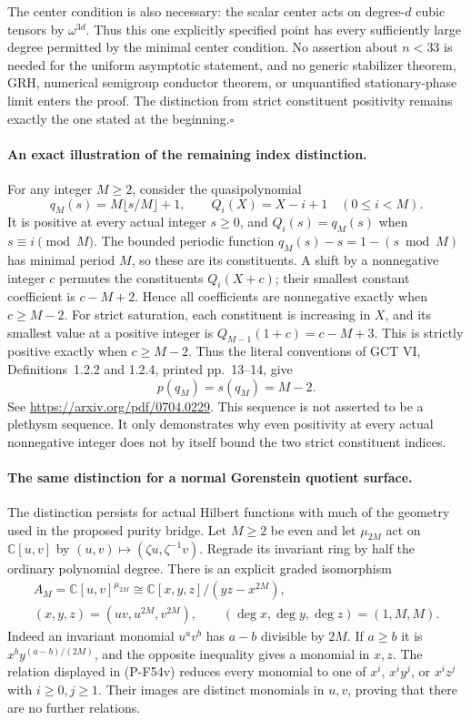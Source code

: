 \documentclass[11pt,a4paper]{article}
\begin{document}
The center condition is also necessary: the scalar center
acts on degree-$d$ cubic tensors by $\omega^{3d}$.
Thus this one explicitly specified point has every
sufficiently large degree permitted by the minimal center
condition. No assertion about $n<33$ is needed for the
uniform asymptotic statement, and no generic stabilizer
theorem, GRH, numerical semigroup conductor theorem, or
unquantified stationary-phase limit enters the proof.
The distinction from strict constituent positivity remains
exactly the one stated at the beginning.\hfill$\square$

\paragraph{An exact illustration of the remaining index distinction.}
For any integer $M\ge2$, consider the quasipolynomial
\[
 q_M(s)=M\lfloor s/M\rfloor+1,
 \qquad Q_i(X)=X-i+1\quad(0\le i<M).                       \tag{P-F54t}
\]
It is positive at every actual integer $s\ge0$, and
$Q_i(s)=q_M(s)$ when $s\equiv i\pmod M$.
The bounded periodic function $q_M(s)-s=1-(s\bmod M)$
has minimal period $M$, so these are its constituents.
A shift by a nonnegative integer $c$ permutes the
constituents $Q_i(X+c)$; their smallest constant
coefficient is $c-M+2$. Hence all coefficients are
nonnegative exactly when $c\ge M-2$.
For strict saturation, each constituent is increasing
in $X$, and its smallest value at a positive integer
is $Q_{M-1}(1+c)=c-M+3$. This is strictly positive
exactly when $c\ge M-2$. Thus the literal conventions
of GCT VI, Definitions~1.2.2 and 1.2.4, printed
pp.~13--14, give
\[
                   p(q_M)=s(q_M)=M-2.                    \tag{P-F54u}
\]
See \url{https://arxiv.org/pdf/0704.0229}.
This sequence is not asserted to be a plethysm sequence.
It only demonstrates why even positivity at every actual
nonnegative integer does not by itself bound the two
strict constituent indices.

\paragraph{The same distinction for a normal Gorenstein quotient surface.}
The distinction persists for actual Hilbert functions with much of
the geometry used in the proposed purity bridge. Let $M\ge2$ be even
and let $\mu_{2M}$ act on $\mathbb C[u,v]$ by
$(u,v)\mapsto(\zeta u,\zeta^{-1}v)$. Regrade its invariant ring
by half the ordinary polynomial degree. There is an explicit graded
isomorphism
\[
 \begin{gathered}
 A_M=\mathbb C[u,v]^{\mu_{2M}}
   \cong\mathbb C[x,y,z]/(yz-x^{2M}),\\
 (x,y,z)=(uv,u^{2M},v^{2M}),\qquad
 (\deg x,\deg y,\deg z)=(1,M,M).
 \end{gathered}                                         \tag{P-F54v}
\]
Indeed an invariant monomial $u^av^b$ has $a-b$ divisible
by $2M$. If $a\ge b$ it is $x^by^{(a-b)/(2M)}$, and the
opposite inequality gives a monomial in $x,z$.
The relation displayed in (P-F54v) reduces every monomial
to one of
$x^i$, $x^iy^j$, or $x^iz^j$ with $i\ge0,j\ge1$.
Their images are distinct monomials in $u,v$, proving that
there are no further relations.
\end{document}
